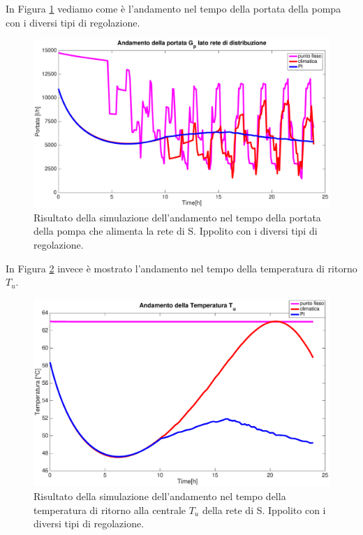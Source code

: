 \documentclass[laurea,oneside,11pt]{USiena_tesiLM}
\begin{document}
In Figura \ref{fig:portate_confronto2} vediamo come è l'andamento nel tempo della portata della pompa con i diversi tipi di regolazione. 

\begin{figure}[!ht]
\centering
\includegraphics[width=\textwidth]{figure/portate_confronto2} 
\caption{Risultato della simulazione dell'andamento nel tempo della portata della pompa che alimenta la rete di S. Ippolito con i diversi tipi di regolazione.}
\label{fig:portate_confronto2}
\end{figure}

In Figura \ref{fig:To_confronto2} invece è mostrato l'andamento nel tempo della temperatura di ritorno $T_u$. 
\begin{figure}[!ht]
\centering
\includegraphics[width=\textwidth]{figure/To_confronto2} 
\caption{Risultato della simulazione dell'andamento nel tempo della temperatura di ritorno alla centrale $T_u$ della rete di S. Ippolito con i diversi tipi di regolazione.}
\label{fig:To_confronto2}
\end{figure}
\end{document}
